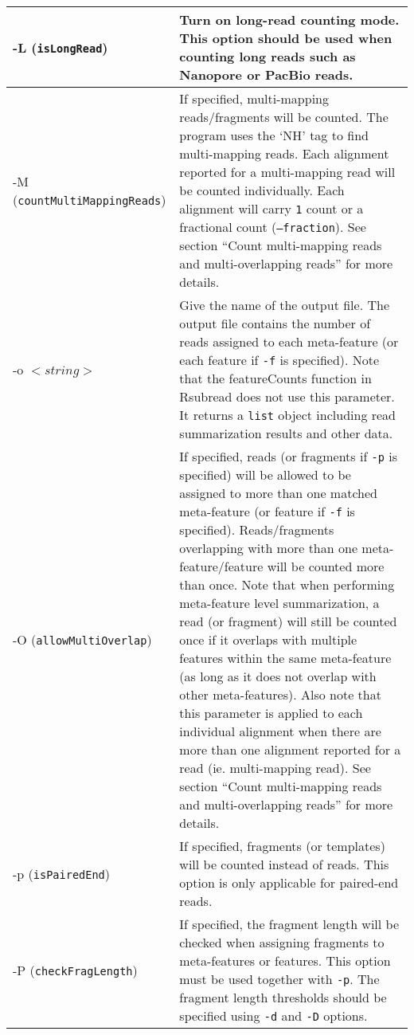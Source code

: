 \documentclass[12pt]{report}
\newcommand{\code}[1]{{\small\texttt{#1}}}
\newcommand{\Rsubread}{\textsf{Rsubread}}
\newcommand{\featureCounts}{\textsf{featureCounts}}
\begin{document}
\begin{longtable}{|p{5cm}|p{11cm}|}
\hline
-L \newline (\code{isLongRead}) & Turn on long-read counting mode. This option should be used when counting long reads such as Nanopore or PacBio reads.\\
\hline
-M \newline (\code{countMultiMappingReads}) & If specified, multi-mapping reads/fragments will be counted. The program uses the `NH' tag to find multi-mapping reads. Each alignment reported for a multi-mapping read will be counted individually. Each alignment will carry \code{1} count or a fractional count (\code{--fraction}). See section ``Count multi-mapping reads and multi-overlapping reads'' for more details.\\
\hline
-o $<string>$ & Give the name of the output file. The output file contains the number of reads assigned to each meta-feature (or each feature if \code{-f} is specified). Note that the {\featureCounts} function in {\Rsubread} does not use this parameter. It returns a \code{list} object including read summarization results and other data. \\
\hline
-O \newline (\code{allowMultiOverlap}) & If specified, reads (or fragments if \code{-p} is specified) will be allowed to be assigned to more than one matched meta-feature (or feature if \code{-f} is specified). Reads/fragments overlapping with more than one meta-feature/feature will be counted more than once. Note that when performing meta-feature level summarization, a read (or fragment) will still be counted once if it overlaps with multiple features within the same meta-feature (as long as it does not overlap with other meta-features). Also note that this parameter is applied to each individual alignment when there are more than one alignment reported for a read (ie. multi-mapping read). See section ``Count multi-mapping reads and multi-overlapping reads'' for more details.\\
\hline
-p \newline (\code{isPairedEnd}) & If specified, fragments (or templates) will be counted instead of reads. This option is only applicable for paired-end reads.\\
\hline
-P \newline (\code{checkFragLength}) & If specified, the fragment length will be checked when assigning fragments to meta-features or features. This option must be used together with \code{-p}. The fragment length thresholds should be specified using \code{-d} and \code{-D} options.\\

\end{longtable}
\end{document}
